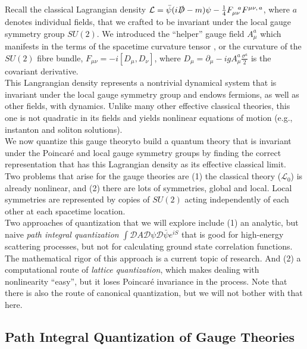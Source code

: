 
\noindent Recall the classical Lagrangian density $\mathcal{L} = \bar{\psi}(i \slashed{D} - m) \psi - \frac{1}{4} F_{\mu\nu}^{\,\,\,\,a} F^{\mu\nu, \, a}$, where $a$ denotes individual fields, that we crafted to be invariant under the local gauge symmetry group $SU(2)$. We introduced the ``helper'' gauge field $A_{\mu}^a$ which manifests in the terms of the spacetime curvature tensor , or the curvature of the $SU(2)$ fibre bundle, $F_{\mu\nu} = -i [D_\mu, D_\nu]$, where $D_\mu = \partial_\mu - i g A_\mu^a \frac{\sigma^a}{2}$ is the covariant derivative. \\

\noindent This Langrangian density represents a nontrivial dynamical system that is invariant under the local gauge symmetry group and endows fermions, as well as other fields, with dynamics. Unlike many other effective classical theories, this one is not quadratic in its fields and yields nonlinear equations of motion (e.g., instanton and soliton solutions). \\

\noindent We now quantize this gauge theoryto build a quantum theory that is invariant under the Poincar\'e and local gauge symmetry groups by finding the correct representation that has this Lagrangian density as its effective classical limit. \\

\noindent Two problems that arise for the gauge theories are (1) the classical theory ($\mathcal{L}_0$) is already nonlinear, and (2) there are lots of symmetries, global and local. Local symmetries are represented by copies of $SU(2)$ acting independently of each other at each spacetime location. \\

\noindent Two approaches of quantization that we will explore include (1) an analytic, but naive \textit{path integral quantization} $\int \mathcal{D} A \mathcal{D} \psi \mathcal{D} \bar{\psi} e^{i S}$ that is good for high-energy scattering processes, but not for calculating ground state correlation functions. The mathematical rigor of this approach is a current topic of research. And (2) a computational route of \textit{lattice quantization}, which makes dealing with nonlinearity ``easy'', but it loses Poincar\'e invariance in the process. Note that there is also the route of canonical quantization, but we will not bother with that here.

\subsection*{Path Integral Quantization of Gauge Theories}

